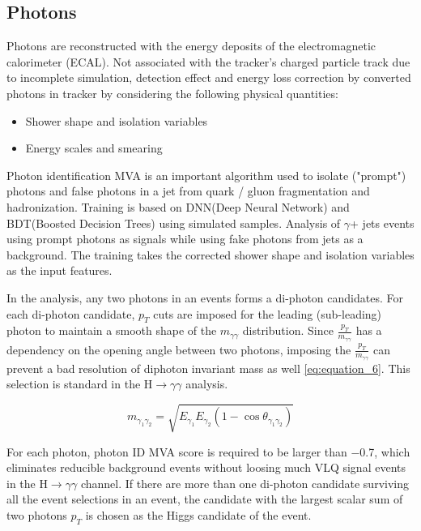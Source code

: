 \subsection{Photons}
Photons are reconstructed with the energy deposits of the electromagnetic calorimeter (ECAL). Not associated with the tracker's charged particle track due to incomplete simulation, detection effect and energy loss correction by converted photons in  tracker by considering the following physical quantities:
\begin{itemize}
    \item Shower shape and isolation variables
    \item Energy scales and smearing
\end{itemize}


Photon identification MVA is an important algorithm used to isolate ("prompt") photons and false photons in a jet from quark / gluon fragmentation and hadronization. Training is  based on DNN(Deep Neural Network) and BDT(Boosted Decision Trees) using simulated samples. 
 Analysis of $\gamma$+ jets events using prompt photons  as signals while using fake photons from jets as a background. The training takes the corrected shower shape and isolation variables as the input features. 
 
 
 In the analysis, any two photons in an events forms a di-photon candidates. For each di-photon candidate, $p_T$ cuts  are imposed for the leading (sub-leading) photon to maintain a smooth shape of the $m_{\gamma\gamma}$ distribution. Since $\frac{p_T}{m_{\gamma\gamma}}$ has a dependency on the opening angle between two photons, imposing the $\frac{p_T}{m_{\gamma\gamma}}$ can prevent a bad resolution of diphoton invariant mass as well \autoref{eq:equation_6}. This selection is standard in the H$\longrightarrow \gamma\gamma$ analysis.
 
 \begin{equation}\label{eq:equation_6}
     m_{\gamma_1\gamma_2} = \sqrt{E_{\gamma_1}E_{\gamma_2}(1- \cos{\theta_{\gamma_1\gamma_2}})}
 \end{equation}
 
 For each photon, photon ID MVA score is required to be larger than −0.7, which eliminates
reducible background events without loosing much VLQ signal events in the H$\longrightarrow \gamma\gamma$ channel.
If there are more than one di-photon candidate surviving all the event selections in an event, the candidate with the largest scalar sum of two photons $p_T$ is chosen as the Higgs candidate of the event.

